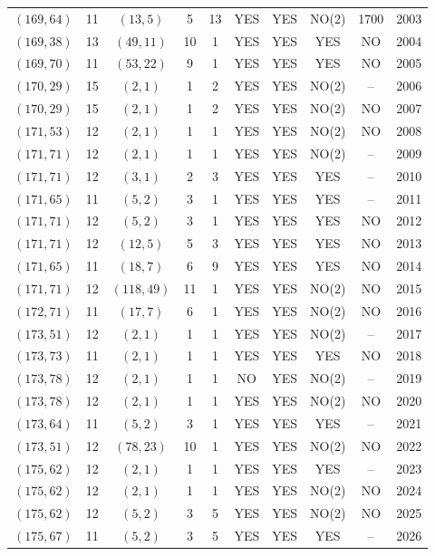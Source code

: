 \begin{longtable}{|c|c|c|c|c|c|c|c|c|c|}
$(169, 64)$ & 11 & $(13, 5)$ & 5 & 13 & YES & YES & NO(2) & 1700 & 2003\\
$(169, 38)$ & 13 & $(49, 11)$ & 10 & 1 & YES & YES & YES & NO & 2004\\
$(169, 70)$ & 11 & $(53, 22)$ & 9 & 1 & YES & YES & YES & NO & 2005\\
$(170, 29)$ & 15 & $(2, 1)$ & 1 & 2 & YES & YES & NO(2) & -- & 2006\\
$(170, 29)$ & 15 & $(2, 1)$ & 1 & 2 & YES & YES & NO(2) & NO & 2007\\
$(171, 53)$ & 12 & $(2, 1)$ & 1 & 1 & YES & YES & NO(2) & NO & 2008\\
$(171, 71)$ & 12 & $(2, 1)$ & 1 & 1 & YES & YES & NO(2) & -- & 2009\\
$(171, 71)$ & 12 & $(3, 1)$ & 2 & 3 & YES & YES & YES & -- & 2010\\
$(171, 65)$ & 11 & $(5, 2)$ & 3 & 1 & YES & YES & YES & -- & 2011\\
$(171, 71)$ & 12 & $(5, 2)$ & 3 & 1 & YES & YES & YES & NO & 2012\\
$(171, 71)$ & 12 & $(12, 5)$ & 5 & 3 & YES & YES & YES & NO & 2013\\
$(171, 65)$ & 11 & $(18, 7)$ & 6 & 9 & YES & YES & YES & NO & 2014\\
$(171, 71)$ & 12 & $(118, 49)$ & 11 & 1 & YES & YES & NO(2) & NO & 2015\\
$(172, 71)$ & 11 & $(17, 7)$ & 6 & 1 & YES & YES & NO(2) & NO & 2016\\
$(173, 51)$ & 12 & $(2, 1)$ & 1 & 1 & YES & YES & NO(2) & -- & 2017\\
$(173, 73)$ & 11 & $(2, 1)$ & 1 & 1 & YES & YES & YES & NO & 2018\\
$(173, 78)$ & 12 & $(2, 1)$ & 1 & 1 & NO & YES & NO(2) & -- & 2019\\
$(173, 78)$ & 12 & $(2, 1)$ & 1 & 1 & YES & YES & NO(2) & NO & 2020\\
$(173, 64)$ & 11 & $(5, 2)$ & 3 & 1 & YES & YES & YES & -- & 2021\\
$(173, 51)$ & 12 & $(78, 23)$ & 10 & 1 & YES & YES & NO(2) & NO & 2022\\
$(175, 62)$ & 12 & $(2, 1)$ & 1 & 1 & YES & YES & YES & -- & 2023\\
$(175, 62)$ & 12 & $(2, 1)$ & 1 & 1 & YES & YES & NO(2) & NO & 2024\\
$(175, 62)$ & 12 & $(5, 2)$ & 3 & 5 & YES & YES & NO(2) & NO & 2025\\
$(175, 67)$ & 11 & $(5, 2)$ & 3 & 5 & YES & YES & YES & -- & 2026\\

\end{longtable}
